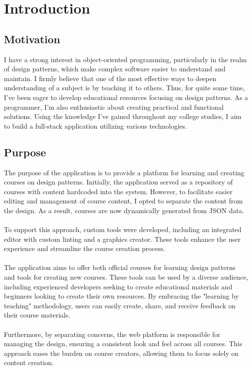 \chapter{Introduction}

\section{Motivation}

I have a strong interest in object-oriented programming, particularly in the realm of design patterns, which make complex software easier to understand and maintain. I firmly believe that one of the most effective ways to deepen understanding of a subject is by teaching it to others. Thus, for quite some time, I've been eager to develop educational resources focusing on design patterns. As a programmer, I'm also enthusiastic about creating practical and functional solutions. Using the knowledge I've gained throughout my college studies, I aim to build a full-stack application utilizing various technologies.

\section{Purpose}

The purpose of the application is to provide a platform for learning and creating courses on design patterns. Initially, the application served as a repository of courses with content hardcoded into the system. However, to facilitate easier editing and management of course content, I opted to separate the content from the design. As a result, courses are now dynamically generated from JSON data.
\\\\
\noindent To support this approach, custom tools were developed, including an integrated editor with custom linting and a graphics creator. These tools enhance the user experience and streamline the course creation process.
\\\\
\noindent The application aims to offer both official courses for learning design patterns and tools for creating new courses. These tools can be used by a diverse audience, including experienced developers seeking to create educational materials and beginners looking to create their own resources. By embracing the "learning by teaching" \cite{learn-by-teaching} methodology, users can easily create, share, and receive feedback on their course materials.
\\\\
\noindent Furthermore, by separating concerns, the web platform is responsible for managing the design, ensuring a consistent look and feel across all courses. This approach eases the burden on course creators, allowing them to focus solely on content creation.

